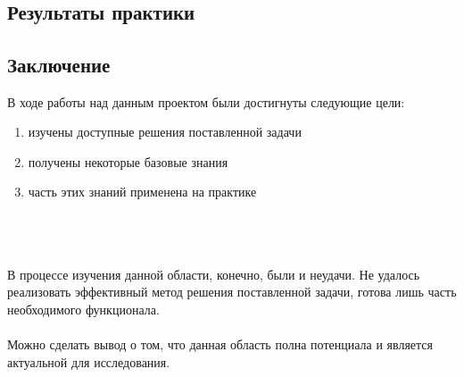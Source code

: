 \documentclass{article}
\begin{document}
    
    \\
    \newpage
    \begin{center} 
    \section{Результаты практики}
    \end{center}
    \large
    
    \newpage
    \begin{center} 
    \section{Заключение}
    \end{center}
    \large
    В ходе работы над данным проектом были достигнуты следующие цели:\\
    \begin{enumerate}
        \item изучены доступные решения поставленной задачи
        \item получены некоторые базовые знания
        \item часть этих знаний применена на практике
    \end{enumerate}
    \\ \\ \\
    В процессе изучения данной области, конечно, были и неудачи. Не удалось реализовать эффективный метод решения поставленной задачи, готова лишь часть необходимого функционала.
    \\ \\
    Можно сделать вывод о том, что данная область полна потенциала и является актуальной для исследования.
    
\end{document}
